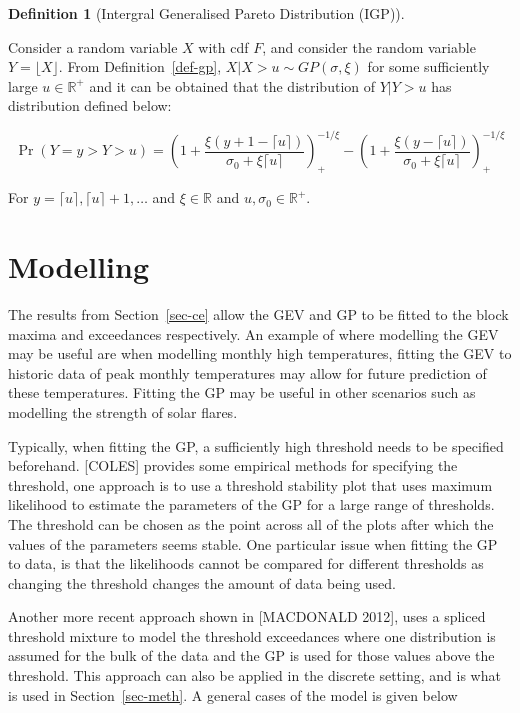 \documentclass[
  10pt,
  a4paper,
]{scrreprt}
\theoremstyle{plain}
\theoremstyle{plain}
\theoremstyle{definition}
\newtheorem{definition}{Definition}[section]
\theoremstyle{plain}
\theoremstyle{remark}
\begin{document}
{\begin{definition}[Intergral Generalised Pareto Distribution
(IGP)]\protect\hypertarget{def-igp}{}\label{def-igp}

Consider a random variable \(X\) with cdf \(F\), and consider the random
variable \(Y=\lfloor X \rfloor\). From Definition~\ref{def-gp},
\(X|X>u \sim GP(\sigma, \xi)\) for some sufficiently large
\(u\in \mathbb R^+\) and it can be obtained that the distribution of
\(Y|Y>u\) has distribution defined below:

\[
\Pr(Y=y>Y>u) = \left(1+\displaystyle\frac{\xi(y+1-\lceil u\rceil)}{\sigma_0+\xi\lceil u\rceil}\right)_+^{-1/\xi}-\left(1+\displaystyle\frac{\xi(y-\lceil u\rceil)}{\sigma_0+\xi\lceil u\rceil}\right)_+^{-1/\xi}
\]

For \(y=\lceil u\rceil,\lceil u\rceil+1, \ldots\) and
\(\xi \in \mathbb R\) and \(u, \sigma_0 \in \mathbb R^+.\)

\end{definition}

\hypertarget{sec-mod}{%
\section{Modelling}\label{sec-mod}}

The results from Section~\ref{sec-ce} allow the GEV and GP to be fitted
to the block maxima and exceedances respectively. An example of where
modelling the GEV may be useful are when modelling monthly high
temperatures, fitting the GEV to historic data of peak monthly
temperatures may allow for future prediction of these temperatures.
Fitting the GP may be useful in other scenarios such as modelling the
strength of solar flares.

Typically, when fitting the GP, a sufficiently high threshold needs to
be specified beforehand. {[}COLES{]} provides some empirical methods for
specifying the threshold, one approach is to use a threshold stability
plot that uses maximum likelihood to estimate the parameters of the GP
for a large range of thresholds. The threshold can be chosen as the
point across all of the plots after which the values of the parameters
seems stable. One particular issue when fitting the GP to data, is that
the likelihoods cannot be compared for different thresholds as changing
the threshold changes the amount of data being used.

Another more recent approach shown in {[}MACDONALD 2012{]}, uses a
spliced threshold mixture to model the threshold exceedances where one
distribution is assumed for the bulk of the data and the GP is used for
those values above the threshold. This approach can also be applied in
the discrete setting, and is what is used in Section~\ref{sec-meth}. A
general cases of the model is given below

}
\end{document}
